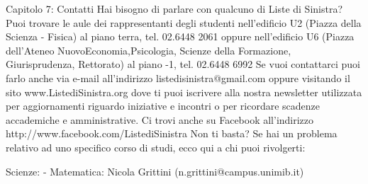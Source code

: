 Capitolo 7: Contatti
Hai bisogno di parlare con qualcuno di Liste di Sinistra? Puoi trovare le aule dei rappresentanti degli studenti  nell'edificio U2 (Piazza della Scienza - Fisica) al piano terra, tel. 02.6448 2061 oppure nell'edificio U6 (Piazza dell'Ateneo NuovoEconomia,Psicologia, Scienze della Formazione, Giurisprudenza, Rettorato) al piano -1, tel. 02.6448 6992
Se vuoi contattarci puoi farlo anche via e-mail all’indirizzo listedisinistra@gmail.com oppure visitando il sito www.ListediSinistra.org dove ti puoi iscrivere alla nostra newsletter utilizzata per aggiornamenti riguardo iniziative e incontri o per ricordare scadenze accademiche e amministrative. Ci trovi anche su Facebook all'indirizzo http://www.facebook.com/ListediSinistra 
Non ti basta? Se hai un problema relativo ad uno specifico corso di studi, ecco qui a chi puoi rivolgerti:

Scienze:
- Matematica: Nicola Grittini (n.grittini@campus.unimib.it)

